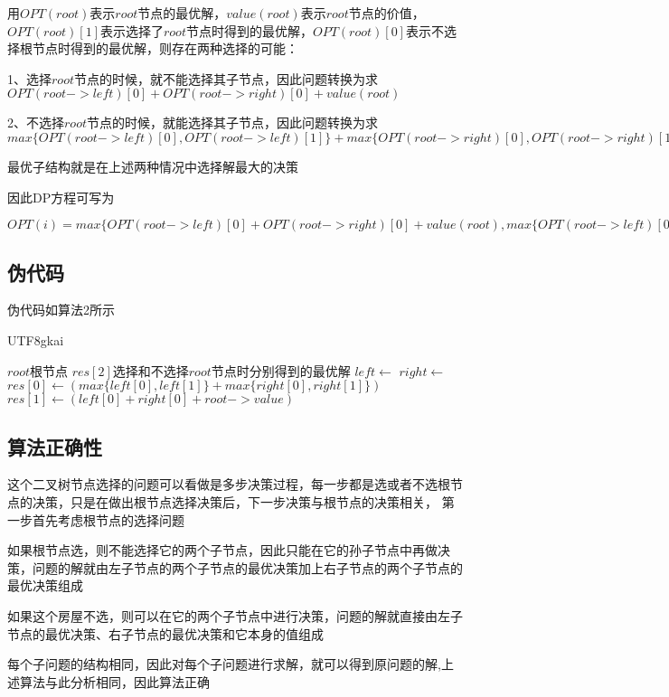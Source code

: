 \documentclass{article}
\begin{document}
用$OPT(root)$表示$root$节点的最优解，$value(root)$表示$root$节点的价值，$OPT(root)[1]$表示选择了$root$节点时得到的最优解，$OPT(root)[0]$表示不选择根节点时得到的最优解，则存在两种选择的可能：
\par 1、选择$root$节点的时候，就不能选择其子节点，因此问题转换为求$OPT(root->left)[0] + OPT(root->right)[0] + value(root)$
\par 2、不选择$root$节点的时候，就能选择其子节点，因此问题转换为求$max\{OPT(root->left)[0], OPT(root->left)[1]\} + max\{OPT(root->right)[0], OPT(root->right)[1]\}$
\par 最优子结构就是在上述两种情况中选择解最大的决策
\par 因此DP方程可写为
\begin{center}
    $OPT(i) = max\{OPT(root->left)[0] + OPT(root->right)[0] + value(root), max\{OPT(root->left)[0], OPT(root->left)[1]\} + max\{OPT(root->right)[0], OPT(root->right)[1]\}\}$
\end{center}

\subsection{伪代码}
\par 伪代码如算法2所示

\begin{CJK*}{UTF8}{gkai}
    \begin{algorithm}
        \caption{二叉树选择}
        \begin{algorithmic}[1] %
            \Require $root$根节点
            \Ensure $res[2]$选择和不选择$root$节点时分别得到的最优解
                    \State {}
                \EndIf
                \State $left \gets$  
                \State $right \gets$  
                \State $res[0] \gets (max\{left[0], left[1]\} + max\{right[0], right[1]\})$ 
                \State $res[1] \gets (left[0] + right[0] + root->value)$
                \State {}
            \EndFunction
        \end{algorithmic}
    \end{algorithm}
\end{CJK*}

\subsection{算法正确性}
这个二叉树节点选择的问题可以看做是多步决策过程，每一步都是选或者不选根节点的决策，只是在做出根节点选择决策后，下一步决策与根节点的决策相关，
第一步首先考虑根节点的选择问题
\par 如果根节点选，则不能选择它的两个子节点，因此只能在它的孙子节点中再做决策，问题的解就由左子节点的两个子节点的最优决策加上右子节点的两个子节点的最优决策组成
\par 如果这个房屋不选，则可以在它的两个子节点中进行决策，问题的解就直接由左子节点的最优决策、右子节点的最优决策和它本身的值组成
\par 每个子问题的结构相同，因此对每个子问题进行求解，就可以得到原问题的解,上述算法与此分析相同，因此算法正确
\end{document}

